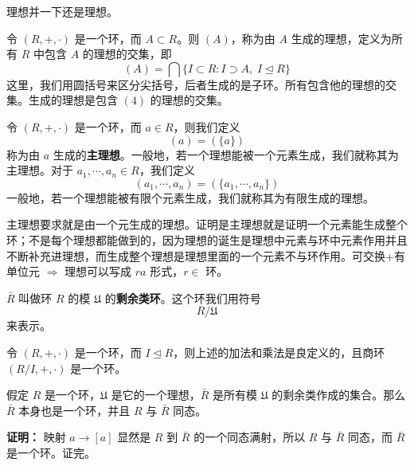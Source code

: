 \begin{note}[理想并一下还是理想]
理想并一下还是理想。
\end{note}

\begin{definition}[定义 2.13：生成理想的定义]
令 $(R,+,\cdot)$ 是一个环，而 $A\subset R$。则 $(A)$，称为由 $A$ 生成的理想，定义为所有 $R$ 中包含 $A$ 的理想的交集，即
\[
(A)=\bigcap\{I\subset R:I\supset A,\;I\trianglelefteq R\}
\]
这里，我们用圆括号来区分尖括号，后者生成的是子环。所有包含他的理想的交集。生成的理想是包含 $(4)$ 的理想的交集。
\end{definition}

\begin{definition}[定义 2.14：主理想]
令 $(R,+,\cdot)$ 是一个环，而 $a\in R$，则我们定义
\[
(a)=(\{a\})
\]
称为由 $a$ 生成的\textbf{主理想}。一般地，若一个理想能被一个元素生成，我们就称其为主理想。对于 $a_1,\cdots,a_n\in R$，我们定义
\[
(a_1,\cdots,a_n)=(\{a_1,\cdots,a_n\})
\]
一般地，若一个理想能被有限个元素生成，我们就称其为有限生成的理想。

主理想要求就是由一个元生成的理想。证明是主理想就是证明一个元素能生成整个环；不是每个理想都能做到的，因为理想的诞生是理想中元素与环中元素作用并且不断补充进理想，而生成整个理想是理想里面的一个元素不与环作用。可交换+有单位元 $\Rightarrow$ 理想可以写成 $ra$ 形式，$r\in$ 环。
\end{definition}

\begin{definition}
$\bar{R}$ 叫做环 $R$ 的模 $\mathfrak{U}$ 的\textbf{剩余类环}。这个环我们用符号
\[
R/\mathfrak{U}
\]
来表示。
\end{definition}

\begin{proposition}
令 $(R,+,\cdot)$ 是一个环，而 $I\trianglelefteq R$，则上述的加法和乘法是良定义的，且商环 $(R/I,+,\cdot)$ 是一个环。
\end{proposition}

\begin{theorem}
假定 $R$ 是一个环，$\mathfrak{U}$ 是它的一个理想，$\bar{R}$ 是所有模 $\mathfrak{U}$ 的剩余类作成的集合。那么 $\bar{R}$ 本身也是一个环，并且 $R$ 与 $\bar{R}$ 同态。

\textbf{证明：} 映射 $a\longrightarrow[a]$ 显然是 $R$ 到 $\bar{R}$ 的一个同态满射，所以 $R$ 与 $\bar{R}$ 同态，而 $\bar{R}$ 是一个环。证完。
\end{theorem}

